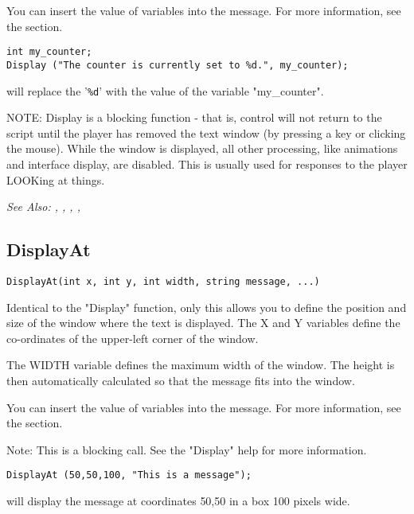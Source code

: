 You can insert the value of variables into the message. For more information,
see the  section.

\begin{verbatim}
int my_counter;
Display ("The counter is currently set to %d.", my_counter);
\end{verbatim}
will replace the '\verb$%d$' with the value of the variable "my_counter".

NOTE: Display is a blocking function - that is, control will not return
to the script until the player has removed the text window (by pressing a
key or clicking the mouse). While the window is displayed, all other
processing, like animations and interface display, are disabled. This is
usually used for responses to the player LOOKing at things.

\it{See Also:} , ,
, ,


\subsection{DisplayAt}\label{DisplayAt}%

\begin{verbatim}
DisplayAt(int x, int y, int width, string message, ...)

\end{verbatim}
Identical to the "Display" function, only this allows you to define the
position and size of the window where the text is displayed. The X and Y
variables define the co-ordinates of the upper-left corner of the window.

The WIDTH variable defines the maximum width of the window. The height is then
automatically calculated so that the message fits into the window.

You can insert the value of variables into the message. For more information,
see the  section.

Note: This is a blocking call. See the "Display" help for more information.

\begin{verbatim}
DisplayAt (50,50,100, "This is a message");
\end{verbatim}
will display the message at coordinates 50,50 in a box 100 pixels wide.

